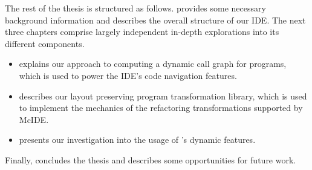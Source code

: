 The rest of the thesis is structured as follows.
 provides some necessary background
information and describes the overall structure of our IDE. The next three
chapters comprise largely independent in-depth explorations into its
different components.

\begin{itemize}

\item {} explains our approach to
computing a dynamic call graph for \matlab programs, which is used to power the
IDE's code navigation features.

\item {} describes our layout
preserving program transformation library, which is used to implement the
mechanics of the refactoring transformations supported by McIDE.

\item {} presents our investigation into the
usage of \matlab's dynamic features.

\end{itemize}

Finally,  concludes the thesis and describes some
opportunities for future work.
